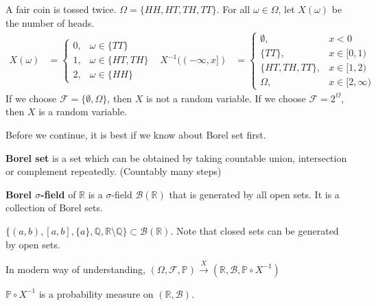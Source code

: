 \documentclass{huhtakm-template-book}
\newcommand{\prob}{\mathbb{P}}
\begin{document}
    \newpage
    \begin{eg}
        \label{Toss coin twice}
        A fair coin is tossed twice. $\Omega=\{HH,HT,TH,TT\}$. For all $\omega\in\Omega$, let $X(\omega)$ be the number of heads.
        \begin{align*}
            X(\omega)&=\begin{cases}
                0, &\omega\in\{TT\}\\
                1, &\omega\in\{HT,TH\}\\
                2, &\omega\in\{HH\}
            \end{cases} & X^{-1}((-\infty,x])&=\begin{cases}
                \emptyset, & x<0\\
                \{TT\}, & x\in[0,1)\\
                \{HT,TH,TT\}, & x\in[1,2)\\
                \Omega, &x\in[2,\infty)
            \end{cases}
        \end{align*}
        If we choose $\mathcal{F}=\{\emptyset,\Omega\}$, then $X$ is not a random variable. If we choose $\mathcal{F}=2^{\Omega}$, then $X$ is a random variable.
    \end{eg}
    Before we continue, it is best if we know about Borel set first.
    \begin{defn}
        \textbf{Borel set} is a set which can be obtained by taking countable union, intersection or complement repeatedly. (Countably many steps)
    \end{defn}
    \begin{defn}
        \textbf{Borel $\sigma$-field} of $\mathbb{R}$ is a $\sigma$-field $\mathcal{B}(\mathbb{R})$ that is generated by all open sets. It is a collection of Borel sets.
    \end{defn}
    \begin{eg}
        $\{(a,b),[a,b],\{a\},\mathbb{Q},\mathbb{R}\setminus\mathbb{Q}\}\subset\mathcal{B}(\mathbb{R})$. Note that closed sets can be generated by open sets.
    \end{eg}
    \begin{rem}
        In modern way of understanding, $(\Omega,\mathcal{F},\prob)\xrightarrow{X}(\mathbb{R},\mathcal{B},\prob\circ X^{-1})$
    \end{rem}
    \begin{cla}
        $\prob\circ X^{-1}$ is a probability measure on $(\mathbb{R},\mathcal{B})$.
    \end{cla}
\end{document}
